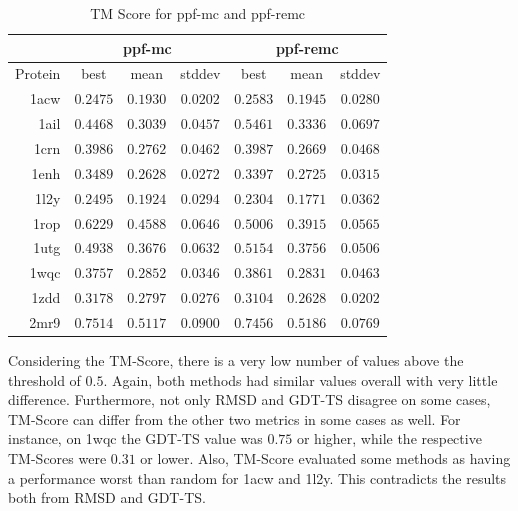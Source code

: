 \begin{table}
  \centering
  \begin{tabular}{r|c|c|c||c|c|c}
            & \multicolumn{3}{c}{ppf-mc} & \multicolumn{3}{||c}{ppf-remc} \\ \hline
    Protein & best          & mean          & stddev   & best          & mean          & stddev   \\ \hline \hline
    1acw    & $0.2475$      & $0.1930$      & $0.0202$ & $0.2583$      & $0.1945$      & $0.0280$ \\ \hline
    1ail    & $0.4468$      & $0.3039$      & $0.0457$ & $\bm{0.5461}$ & $0.3336$      & $0.0697$ \\ \hline
    1crn    & $0.3986$      & $0.2762$      & $0.0462$ & $0.3987$      & $0.2669$      & $0.0468$ \\ \hline
    1enh    & $0.3489$      & $0.2628$      & $0.0272$ & $0.3397$      & $0.2725$      & $0.0315$ \\ \hline
    1l2y    & $0.2495$      & $0.1924$      & $0.0294$ & $0.2304$      & $0.1771$      & $0.0362$ \\ \hline
    1rop    & $\bm{0.6229}$ & $0.4588$      & $0.0646$ & $\bm{0.5006}$ & $0.3915$      & $0.0565$ \\ \hline
    1utg    & $0.4938$      & $0.3676$      & $0.0632$ & $\bm{0.5154}$ & $0.3756$      & $0.0506$ \\ \hline
    1wqc    & $0.3757$      & $0.2852$      & $0.0346$ & $0.3861$      & $0.2831$      & $0.0463$ \\ \hline
    1zdd    & $0.3178$      & $0.2797$      & $0.0276$ & $0.3104$      & $0.2628$      & $0.0202$ \\ \hline
    2mr9    & $\bm{0.7514}$ & $\bm{0.5117}$ & $0.0900$ & $\bm{0.7456}$ & $\bm{0.5186}$ & $0.0769$ \\ \hline
  \end{tabular}
  \caption{TM Score for ppf-mc and ppf-remc}
  \label{tab:tmscore-data}
\end{table}

Considering the TM-Score, there is a very low number of values above the
threshold of $0.5$. Again, both methods had similar values overall with very
little difference. Furthermore, not only RMSD and GDT-TS disagree on some cases,
TM-Score can differ from the other two metrics in some cases as well. For
instance, on 1wqc the GDT-TS value was $0.75$ or higher, while the respective
TM-Scores were $0.31$ or lower. Also, TM-Score evaluated some methods as having
a performance worst than random for 1acw and 1l2y. This contradicts the results
both from RMSD and GDT-TS.

